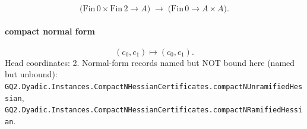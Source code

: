 \[\bigl(\mathrm{Fin}\,0\times\mathrm{Fin}\,2\to A\bigr)\;\longrightarrow\;\bigl(\mathrm{Fin}\,0\to A\times A\bigr).\]
\paragraph{compact normal form}
\[(c_0,c_1)\mapsto(c_0,c_1).\]
Head coordinates: 2. Normal-form records named but NOT bound here (named but unbound): \texttt{GQ2.Dyadic.Instances.CompactNHessianCertificates.compactNUnramifiedHessian}, \texttt{GQ2.Dyadic.Instances.CompactNHessianCertificates.compactNRamifiedHessian}.
